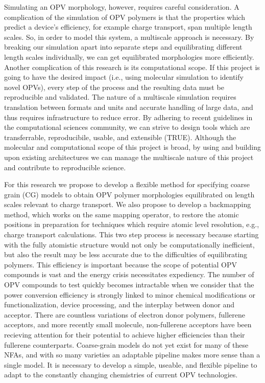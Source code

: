 Simulating an OPV morphology, however, requires careful consideration. %
A complication of the simulation of OPV polymers is that the properties which predict a device's efficiency, for example charge transport, span multiple length scales.
So, in order to model this system, a multiscale approach is necessary.
By breaking our simulation apart into separate steps and equilibrating different length scales individually, we can get equilibrated morphologies more efficiently.
Another complication of this research is its computational scope.
If this project is going to have the desired impact (i.e., using molecular simulation to identify novel OPVs), every step of the process and the resulting data must be reproducible and validated.
The nature of a multiscale simulation requires translation between formats and units and accurate handling of large data, and thus requires infrastructure to reduce error.
By adhering to recent guidelines in the computational sciences community, we can strive to design tools which are transferrable, reproducibile, usable, and extensible (TRUE)\cite{Thompson2020}.
Although the molecular and computational scope of this project is broad, by using and building upon existing architectures we can manage the multiscale nature of this project and contribute to reproducible science. %

For this research we propose to develop a flexible method for specifying coarse grain (CG) models to obtain OPV polymer morphologies equilibrated on length scales relevant to charge transport.
We also propose to develop a backmapping method, which works on the same mapping operator, to restore the atomic positions in preparation for techniques which require atomic level resolution, e.g., charge transport calculations.
This two step process is necessary because starting with the fully atomistic structure would not only be computationally inefficient, but also the result may be less accurate due to the difficulties of equilibrating polymers\cite{Gartner2019a}.
This efficiency is important because the scope of potential OPV compounds is vast and the energy crisis necessitates expediency.
The number of OPV compounds to test quickly becomes intractable when we consider that the power conversion efficiency is strongly linked to minor chemical modifications or functionalization, device processing, and the interplay between donor and acceptor\cite{Mazzio2015,Swick2019a}.
There are countless variations of electron donor polymers, fullerene acceptors, and more recently small molecule, non-fullerene acceptors have been recieving attention for their potential to achieve higher efficiencies than their fullerene counterparts\cite{Dou2013}.
Coarse-grain models do not yet exist for many of these NFAs, and with so many varieties an adaptable pipeline makes more sense than a single model.
It is necessary to develop a simple, useable, and flexible pipeline to adapt to the constantly changing chemistries of current OPV technologies.

